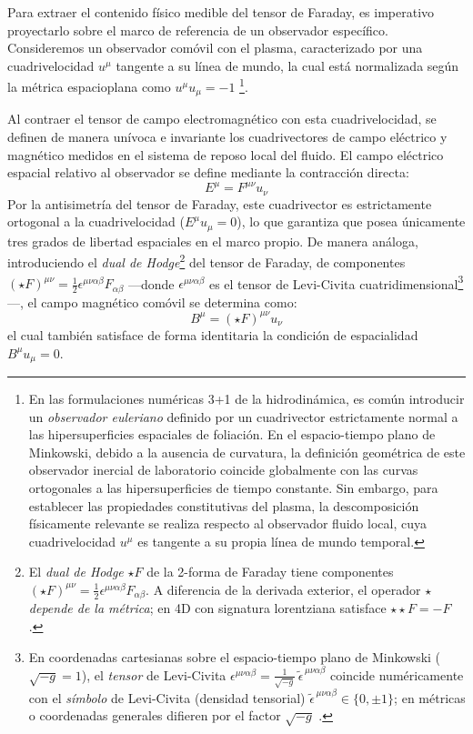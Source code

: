 \primerparrafo Para extraer el contenido físico medible del tensor de Faraday, es imperativo proyectarlo sobre el marco de referencia de un observador específico. Consideremos un observador comóvil con el plasma, caracterizado por una cuadrivelocidad $u^\mu$ tangente a su línea de mundo, la cual está normalizada según la métrica espacioplana como $u^\mu u_\mu = -1$ \footnote{En las formulaciones numéricas 3+1 de la hidrodinámica, es común introducir un \textit{observador euleriano} definido por un cuadrivector estrictamente normal a las hipersuperficies espaciales de foliación. En el espacio-tiempo plano de Minkowski, debido a la ausencia de curvatura, la definición geométrica de este observador inercial de laboratorio coincide globalmente con las curvas ortogonales a las hipersuperficies de tiempo constante. Sin embargo, para establecer las propiedades constitutivas del plasma, la descomposición físicamente relevante se realiza respecto al observador fluido local, cuya cuadrivelocidad $u^\mu$ es tangente a su propia línea de mundo temporal.}. 

Al contraer el tensor de campo electromagnético con esta cuadrivelocidad, se definen de manera unívoca e invariante los cuadrivectores de campo eléctrico y magnético medidos en el sistema de reposo local del fluido. El campo eléctrico espacial relativo al observador se define mediante la contracción directa:
\begin{equation}
    E^\mu = F^{\mu\nu} u_\nu
\end{equation}
Por la antisimetría del tensor de Faraday, este cuadrivector es estrictamente ortogonal a la cuadrivelocidad ($E^\mu u_\mu = 0$), lo que garantiza que posea únicamente tres grados de libertad espaciales en el marco propio. De manera análoga, introduciendo el \emph{dual de Hodge}\footnote{El \emph{dual de Hodge} $\star F$ de la 2-forma de Faraday tiene componentes $(\star F)^{\mu\nu}=\tfrac12\epsilon^{\mu\nu\alpha\beta}F_{\alpha\beta}$. A diferencia de la derivada exterior, el operador $\star$ \emph{depende de la métrica}; en 4D con signatura lorentziana satisface $\star\star F=-F$ \parencite{nakahara-2003, baez-muniain-1994}.} del tensor de Faraday, de componentes $(\star F)^{\mu\nu} = \frac{1}{2} \epsilon^{\mu\nu\alpha\beta} F_{\alpha\beta}$ —donde $\epsilon^{\mu\nu\alpha\beta}$ es el tensor de Levi-Civita cuatridimensional\footnote{En coordenadas cartesianas sobre el espacio-tiempo plano de Minkowski ($\sqrt{-g}=1$), el \emph{tensor} de Levi-Civita $\epsilon^{\mu\nu\alpha\beta}=\tfrac{1}{\sqrt{-g}}\,\tilde{\epsilon}^{\,\mu\nu\alpha\beta}$ coincide numéricamente con el \emph{símbolo} de Levi-Civita (densidad tensorial) $\tilde{\epsilon}^{\,\mu\nu\alpha\beta}\in\{0,\pm1\}$; en métricas o coordenadas generales difieren por el factor $\sqrt{-g}$ \parencite{nakahara-2003}.}—, el campo magnético comóvil se determina como:
\begin{equation}
    B^\mu = (\star F)^{\mu\nu} u_\nu
\end{equation}
el cual también satisface de forma identitaria la condición de espacialidad $B^\mu u_\mu = 0$.

